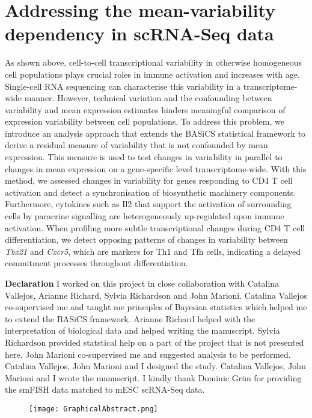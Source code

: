 
\chapter{Addressing the mean-variability dependency in scRNA-Seq data}  

\graphicspath{{Chapter2/Figures/}}

\vfill

\begin{Abstract}
As shown above, cell-to-cell transcriptional variability in otherwise homogeneous cell populations plays crucial roles in immune activation and increases with age. Single-cell RNA sequencing can characterise this variability in a transcriptome-wide manner. However, technical variation and the confounding between variability and mean expression estimates hinders meaningful comparison of expression variability between cell populations. To address this problem, we introduce an analysis approach that extends the BASiCS statistical framework to derive a residual measure of variability that is not confounded by mean expression. This measure is used to test changes in variability in parallel to changes in mean expression on a gene-specific level transcriptome-wide.
With this method, we assessed changes in variability for genes responding to CD4\plus{} T cell activation and detect a synchronisation of biosynthetic machinery components. Furthermore, cytokines such as Il2 that support the activation of surrounding cells by paracrine signalling are heterogeneously up-regulated upon immune activation. When profiling more subtle transcriptional changes during CD4\plus{} T cell differentiation, we detect opposing patterns of changes in variability between \textit{Tbx21} and \textit{Cxcr5}, which are markers for Th1 and Tfh cells, indicating a delayed commitment processes throughout differentiation. 
\end{Abstract}

\vfill

\newpage

\begin{Comment}
\textbf{Declaration} I worked on this project in close collaboration with Catalina Vallejos, Arianne Richard, Sylvia Richardson and John Marioni. Catalina Vallejos co-supervised me and taught me principles of Bayesian statistics which helped me to extend the BASiCS framework. Arianne Richard helped with the interpretation of biological data and helped writing the manuscript. Sylvia Richardson provided statstical help on a part of the project that is not presented here. John Marioni co-supervised me and suggested analysis to be performed. Catalina Vallejos, John Marioni and I designed the study. Catalina Vallejos, John Marioni and I wrote the manuscript. I kindly thank Dominic Gr\"un for providing the smFISH data matched to mESC scRNA-Seq data. 
\end{Comment}

\begin{figure}[hb]
\centering    
\texttt{[image: GraphicalAbstract.png]}
\caption*{}
\end{figure}


\newpage


\newpage


